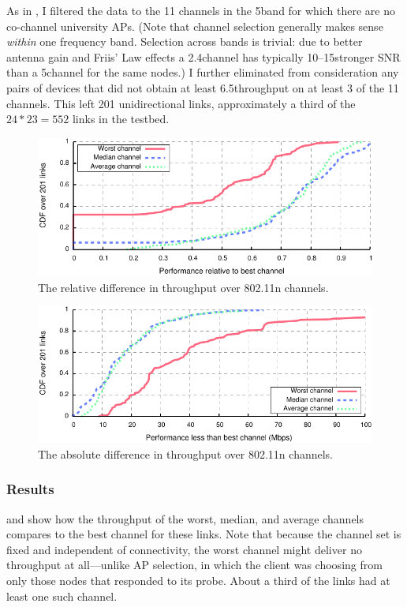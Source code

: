 As in , I filtered the data to the 11 channels in the 5\GHz band for which there are no co-channel university APs. (Note that channel selection generally makes sense \emph{within} one frequency band. Selection across bands is trivial: due to better antenna gain and Friis' Law effects a 2.4\GHz channel has typically 10\dB--15\dB stronger SNR than a 5\GHz channel for the same nodes.) I further eliminated from consideration any pairs of devices that did not obtain at least 6.5\Mbps throughput on at least 3 of the 11 channels. This left 201 unidirectional links, approximately a third of the $24*23=552$ links in the testbed.

\begin{figure}[t]
	\centering
	\includegraphics[width=\textwidth]{figures/applications/chan_sel_rel_diff.pdf}
	\caption[The relative difference in throughput over 802.11n channels]{\label{fig:chan_sel_rel_diff}The relative difference in throughput over 802.11n channels.}
\end{figure}

\begin{figure}[t]
	\centering
	\includegraphics[width=\textwidth]{figures/applications/chan_sel_tpt_diff.pdf}
	\caption[The absolute difference in throughput over 802.11n channels]{\label{fig:chan_sel_tpt_diff}The absolute difference in throughput over 802.11n channels.}
\end{figure}

\subsubsection{Results}
 and  show how the throughput of the worst, median, and average channels compares to the best channel for these links. Note that because the channel set is fixed and independent of connectivity, the worst channel might deliver no throughput at all---unlike AP selection, in which the client was choosing from only those nodes that responded to its probe. About a third of the links had at least one such channel.

